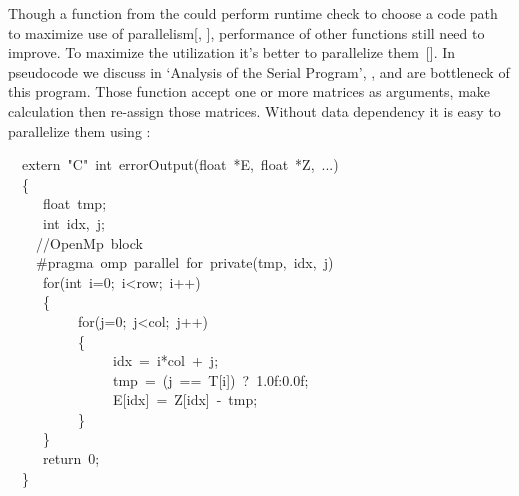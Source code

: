 \documentclass{article}
\begin{document}
\noindent{}Though a function from the  could perform runtime check to choose a code path to maximize use of parallelism[, ], performance of other functions still need to improve. To maximize the utilization it's better to parallelize them~[]. In pseudocode we discuss in \textquoteleft{}Analysis of the Serial Program\textquoteright{}, ,  and  are bottleneck of this program. Those function accept one or more matrices as arguments, make calculation then re-assign those matrices. Without data dependency it is easy to parallelize them using :%
\begin{mdpre}%
\noindent~~extern~{"}{C}{"}~{int}~errorOutput({float}~*{E},~{float}~*{Z},~...)\\
~~\{\\
~~~~~{float}~tmp;\\
~~~~~{int}~idx,~j;\\
~~~~{//OpenMp~block~}\\
~~~~\#pragma~omp~parallel~{for}~{private}(tmp,~idx,~j)\\
~~~~~{for}({int}~i={0};~i\textless{}row;~i++)\\
~~~~~\{\\
~~~~~~~~~~{for}(j={0};~j\textless{}col;~j++)\\
~~~~~~~~~~\{\\
~~~~~~~~~~~~~~~idx~=~i*col~+~j;\\
~~~~~~~~~~~~~~~tmp~=~(j~==~{T}[i])~?~{1.0f}:{0.0f};\\
~~~~~~~~~~~~~~~{E}[idx]~=~{Z}[idx]~-~tmp;\\
~~~~~~~~~~\}\\
~~~~~\}\\
~~~~~{return}~{0};\\
~~\}\\
\end{mdpre}
\end{document}
